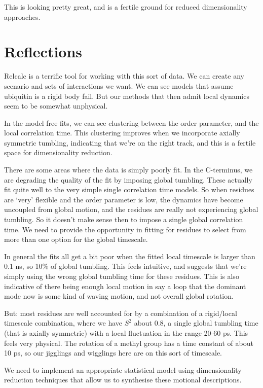 \documentclass[showkeys,aps,prb,prepreint,amssymb, amsmath,nobibnotes]{article}
\begin{document}
This is looking pretty great, and is a fertile ground for reduced dimensionality approaches.

\section{Reflections}

Relcalc is a terrific tool for working with this sort of data. We can create any scenario and sets of interactions we want. We can see models that assume ubiquitin is a rigid body fail. But our methods that then admit local dynamics seem to be somewhat unphysical.

In the model free fits, we can see clustering between the order parameter, and the local correlation time. This clustering improves when we incorporate axially symmetric tumbling, indicating that we're on the right track, and this is a fertile space for dimensionality reduction.

There are some areas where the data is simply poorly fit. In the C-terminus, we are degrading the quality of the fit by imposing global tumbling. These actually fit quite well to the very simple single correlation time models. So when residues are `very' flexible and the order parameter is low, the dynamics have become uncoupled from global motion, and the residues are really not experiencing global tumbling. So it doesn't make sense then to impose a single global correlation time. We need to provide the opportunity in fitting for residues to select from more than one option for the global timescale.

In general the fits all get a bit poor when the fitted local timescale is larger than 0.1 ns, so 10\% of global tumbling. This feels intuitive, and suggests that we're simply using the wrong global tumbling time for these residues. This is also indicative of there being enough local motion in say a loop that the dominant mode now is some kind of waving motion, and not overall global rotation.

But: most residues are well accounted for by a combination of a rigid/local timescale combination, where we have $S^2$ about 0.8, a single global tumbling time (that is axially symmetric) with a local fluctuation in the range 20-60 ps. This feels very physical. The rotation of a methyl group has a time constant of about 10 ps, so our jigglings and wigglings here are on this sort of timescale.

We need to implement an appropriate statistical model using dimensionality reduction techniques that allow us to synthesise these motional descriptions.
\end{document}
